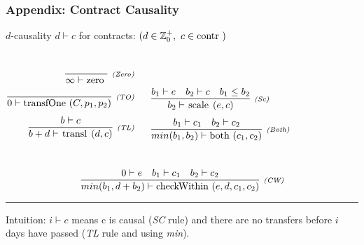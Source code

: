 \documentclass[xcolor=dvipsnames,11pt]{beamer}
\renewcommand{\emph}[1]{\textcolor{structure!90}{#1}}
\newcommand{\ttt}[1]{\mbox{\cd{#1}~}}
\newcommand{\zero}{\ttt{zero}}
\newcommand{\transfOne}{\ttt{transfOne}}
\newcommand{\scale}{\ttt{scale}}
\newcommand{\transl}{\ttt{transl}}
\newcommand{\both}{\ttt{both}}
\newcommand{\checkWithin}{\ttt{checkWithin}}
\begin{document}
\begin{frame}[t]
    \frametitle{Appendix: Contract Causality}

\emph{$d$-causality} $ d \vdash c$ for contracts:
{\scriptsize $ (d \in \mathbb{Z}_0^+, \ c \in \ttt{contr})$}

\begin{columns}
\begin{align*}
\crule{(Zero)}{}{\infty \vdash \zero}&\\[1ex]
\crule{(TO)}{}{0 \vdash \transfOne(C,p_1,p_2)}&\\[1ex]
\crule{(TL)}{b \vdash c}{b + d \vdash \transl(d,c)}&\\[1ex]
\end{align*}

\begin{align*}
&\\[1ex]
&\crule{(Sc)}{b_1 \vdash e\ \ \ b_2\vdash c\ \ \ b_1 \leq b_2 }{b_2 \vdash \scale(e,c)}\\[1ex]
&\crule{(Both)}{b_1 \vdash c_1\ \ \ b_2 \vdash c_2}{min(b_1,b_2) \vdash \both(c_1,c_2)}%
\end{align*}
\end{columns}
$$ 
\crule{(CW)}{0\vdash e\ \ \ b_1 \vdash c_1\ \ \ b_2 \vdash c_2}{min(b_1,d+b_2) \vdash \checkWithin(e,d,c_1,c_2)}
$$

\medskip
\hrule
\medskip

\emph{Intuition:} $i \vdash c$ means c is causal (\textit{SC} rule) and there are no transfers before $i$ days have passed (\textit{TL} rule and using \textit{min}).

\end{frame}
\end{document}
